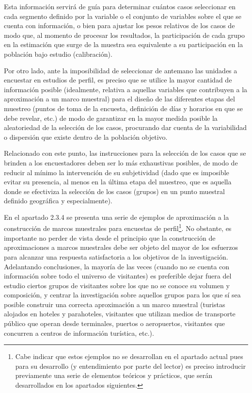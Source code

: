 \documentclass[
]{book}
\begin{document}
Esta información servirá de guía para determinar cuántos casos seleccionar en cada segmento definido por la variable o el conjunto de variables sobre el que se cuenta con información, o bien para ajustar los pesos relativos de los casos de modo que, al momento de procesar los resultados, la participación de cada grupo en la estimación que surge de la muestra sea equivalente a su participación en la población bajo estudio (calibración).

Por otro lado, ante la imposibilidad de seleccionar de antemano las unidades a encuestar en estudios de perfil, es preciso que se utilice la mayor cantidad de información posible (idealmente, relativa a aquellas variables que contribuyen a la aproximación a un marco muestral) para el diseño de las diferentes etapas del muestreo (puntos de toma de la encuesta, definición de días y horarios en que se debe revelar, etc.) de modo de garantizar en la mayor medida posible la aleatoriedad de la selección de los casos, procurando dar cuenta de la variabilidad o dispersión que existe dentro de la población objetivo.

Relacionado con este punto, las instrucciones para la selección de los casos que se brinden a los encuestadores deben ser lo más exhaustivas posibles, de modo de reducir al mínimo la intervención de su subjetividad (dado que es imposible evitar su presencia, al menos en la última etapa del muestreo, que es aquella donde se efectiviza la selección de los casos (grupos) en un punto muestral definido geográfica y especialmente).

En el apartado 2.3.4 se presenta una serie de ejemplos de aproximación a la construcción de marcos muestrales para encuestas de perfil\footnote{Cabe indicar que estos ejemplos no se desarrollan en el apartado actual pues para su desarrollo (y entendimiento por parte del lector) es preciso introducir previamente una serie de elementos teóricos y prácticos, que serán desarrollados en los apartados siguientes.}. No obstante, es importante no perder de vista desde el principio que la construcción de aproximaciones a marcos muestrales debe ser objeto del mayor de los esfuerzos para alcanzar una respuesta satisfactoria a los objetivos de la investigación. Adelantando conclusiones, la mayoría de las veces (cuando no se cuenta con información sobre todo el universo de visitantes) es preferible dejar fuera del estudio ciertos grupos de visitantes sobre los que no se conoce su volumen y composición, y centrar la investigación sobre aquellos grupos para los que sí sea posible construir una correcta aproximación a un marco muestral (turistas alojados en hoteles y parahoteles, visitantes que utilizan medios de transporte público que operan desde terminales, puertos o aeropuertos, visitantes que concurren a centros de información turística, etc.).
\end{document}
